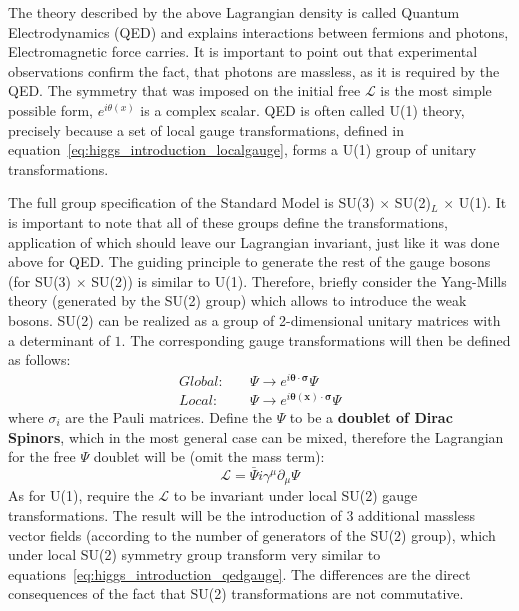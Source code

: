 The theory described by the above Lagrangian density is called Quantum Electrodynamics (QED) and explains interactions between fermions and photons, Electromagnetic force carries. It is important to point out that experimental observations confirm the fact, that photons are massless, as it is required by the QED. The symmetry that was imposed on the initial free $\mathcal{L}$ is the most simple possible form, $e^{i\theta(x)}$ is a complex scalar. QED is often called U(1) theory, precisely because a set of local gauge transformations, defined in equation~\ref{eq:higgs_introduction_localgauge}, forms a U(1) group of unitary transformations.

The full group specification of the Standard Model is SU(3) $\times$ SU(2)$_L$ $\times$ U(1). It is important to note that all of these groups define the transformations, application of which should leave our Lagrangian invariant, just like it was done above for QED. The guiding principle to generate the rest of the gauge bosons (for SU(3) $\times$ SU(2)) is similar to U(1). Therefore, briefly consider the Yang-Mills theory (generated by the SU(2) group) which allows to introduce the weak bosons. SU(2) can be realized as a group of 2-dimensional unitary matrices with a determinant of $1$. The corresponding gauge transformations will then be defined as follows:
\begin{subequations}\label{eq:higgs_introduction_gaugesu2}
\begin{align}
    Global:&\quad \Psi \rightarrow e^{i\boldsymbol{\theta} \cdot \boldsymbol{\sigma}}\Psi\\
    Local:&\quad \Psi \rightarrow e^{i\boldsymbol{\theta(x)} \cdot \boldsymbol\sigma}\Psi\label{eq:higgs_introduction_localgaugesu2}
\end{align}
\end{subequations}
where $\sigma_{i}$ are the Pauli matrices. Define the $\Psi$ to be a \textbf{doublet of Dirac Spinors}, which in the most general case can be mixed, therefore the Lagrangian for the free $\Psi$ doublet will be (omit the mass term):
\begin{equation}
    \label{eq:higgs_introduction_lagrangiagnsu2free}
    \mathcal{L} = \bar{\Psi}i\gamma^{\mu}\partial_{\mu}\Psi
\end{equation}
As for U(1), require the $\mathcal{L}$ to be invariant under local SU(2) gauge transformations. The result will be the introduction of $3$ additional massless vector fields (according to the number of generators of the SU(2) group), which under local SU(2) symmetry group transform very similar to equations~\ref{eq:higgs_introduction_qedgauge}. The differences are the direct consequences of the fact that SU(2) transformations are not commutative.

